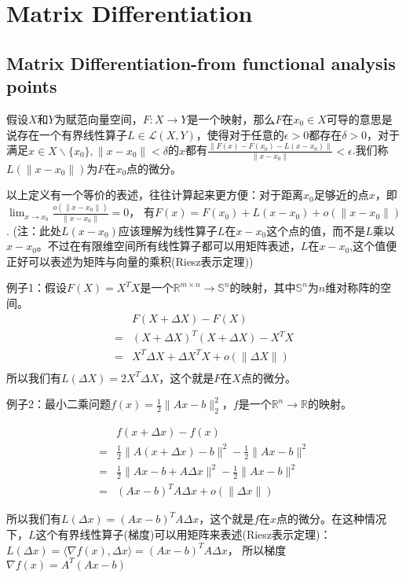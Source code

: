 \documentclass[UTF8]{ctexart}
\begin{document}
\section{Matrix Differentiation}
	\subsection{Matrix Differentiation-from functional analysis points}
		假设$X$和$Y$为赋范向量空间，$F: X\rightarrow Y$是一个映射，那么$F$在$x_0 \in X$可导的意思是说存在一个有界线性算子$L \in \mathcal{L}(X, Y)$，使得对于任意的$\epsilon > 0$都存在$\delta > 0$，对于满足$x \in X \backslash \{x_0\}, \|x - x_0\| < \delta$的$x$都有$\frac{\|F(x) - F(x_0) - L(x - x_0)\|}{\|x - x_0\|} < \epsilon$.我们称$L(\|x - x_0\|)$为$F$在$x_0$点的微分。
		
		以上定义有一个等价的表述，往往计算起来更方便：对于距离$x_0$足够近的点$x$，即
		$\lim_{x \rightarrow x_0}\frac{o(\|x-x_0\|)}{\|x-x_0\|} = 0$，
		有$F(x) = F(x_0) + L(x - x_0) + o(\|x - x_0\|)$.
		(注：此处$L(x-x_0)$应该理解为线性算子$L$在$x - x_0$这个点的值，而不是$L$乘以$x-x_0$。不过在有限维空间所有线性算子都可以用矩阵表述，$L$在$x - x_0$,这个值便正好可以表述为矩阵与向量的乘积(Riesz表示定理))

		例子1：假设$F(X) = X^TX$是一个$\mathbb{R}^{m\times n} \rightarrow \mathbb{ S}^n$的映射，其中$\mathbb{S }^n$为$n$维对称阵的空间。
		\begin{align*} 
		&F(X+\Delta X) - F(X) \\ 
		=& (X+\Delta X)^T(X+\Delta X) - X^TX \\ 
		=& X^T\Delta X + \Delta X^TX + o(\|\Delta X\|) \\
		\end{align*}
		所以我们有$L(\Delta X) = 2X^T\Delta X$，这个就是$F$在$X$点的微分。

		例子2：最小二乘问题$f(x) = \frac{1}{2}\|Ax-b\|_2^2，f$是一个$\mathbb R^n \rightarrow \mathbb R$的映射。

		\begin{align*}
		 &f(x+\Delta x) - f(x) \\ 
		 =& \frac{1}{2}\|A(x+\Delta x) - b\|^2 - \frac{1}{2}\|Ax - b\|^2\\ 
		 =& \frac{1}{2}\|Ax - b + A\Delta x\|^2 - \frac{1}{2}\|Ax - b\|^2\\
		 =& (Ax - b)^TA\Delta x + o(\|\Delta x\|) 
		\end{align*}

		所以我们有$L(\Delta x) = (Ax - b)^TA\Delta x$，这个就是$f$在$x$点的微分。在这种情况下，$L$这个有界线性算子(梯度)可以用矩阵来表述(Riesz表示定理)：
		$L(\Delta x) = \langle \nabla f(x), \Delta x \rangle =  (Ax-b)^TA\Delta x$，
		所以梯度$\nabla f(x) = A^T(Ax - b)$
\end{document}
